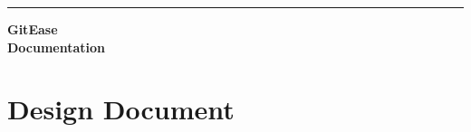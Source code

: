 \documentclass[12pt]{book} %
\begin{document}
\frontmatter

\begin{titlepage} %
	
	\raggedleft %
    \sffamily
    \pagecolor{BlueViolet!55}
    \color{white}
	\rule{3pt}{\textheight} %
	\hspace{0.05\textwidth} %
	\parbox[b]{0.85\textwidth}{ %
		{\fontsize{35}{45}\bfseries GitEase\\[1em] Documentation} %
		
        \vspace{0.5\textheight} %
        
	}

\end{titlepage}

\pagecolor{white}
\rule{0pt}{\textheight}

\thispagestyle{empty}
\pagebreak


\color{black}
\tableofcontents
\listoffigures
\listoftables

\mainmatter


\part{Design Document}






\cleardoublepage %
\setlength{\columnsep}{0.75cm} %
\printindex %

\end{document}
